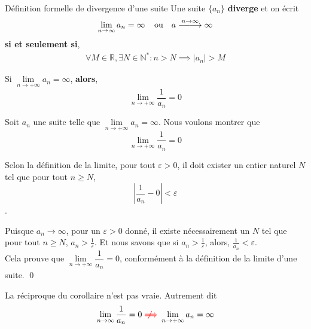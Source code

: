 \documentclass[16pt]{report}
\newcommand{\notimplies}{%
  \mathrel{{\ooalign{\hidewidth$\not\phantom{=}$\hidewidth\cr$\implies$}}}}
\DeclareRobustCommand{\looongrightarrow}{%
  \DOTSB\relbar\joinrel\relbar\joinrel\relbar\joinrel\rightarrow
}
\begin{document}
\begin{multicols*}{2}
    \begin{Definitionx}{Définition formelle de divergence d'une suite}{}
        Une suite $\{ a_n \}$ \textbf{diverge} et on écrit 
      \begin{align*}
        \lim\limits_{n  \to  \infty}{a_n} = 
        \infty \; \; \; \;\text{ou} \quad 
        a \stackrel{n \to \infty}{\looongrightarrow} \infty 
      \end{align*}
      \textbf{si et seulement si},  
        \begin{align*}
            \forall M \in \mathbb{R}, \exists N \in \mathbb{N}^{*} :
            n > N \implies |a_n| > M 
        \end{align*}
    \end{Definitionx}   

    \begin{corollary*}{}{}
       Si $\lim\limits_{n\to+\infty}a_n  = \infty$, \textbf{alors}, 
       \[ \lim\limits_{n\to+\infty}{\dfrac{1}{a_n}}  = 0  \]
   \end{corollary*} 
    

   \begin{Preuve}{}{}
        Soit \( a_n \) une suite telle que 
        \( \lim\limits_{n\to+\infty}a_n = \infty \). 
        Nous voulons montrer que 
        \[ \lim\limits_{n\to+\infty}\dfrac{1}{a_n} = 0 \]
        
        Selon la définition de la limite, pour tout \( \varepsilon > 0 \),
        il doit exister un entier naturel \( N \) tel que pour tout 
        \( n \geq N \), 
        \[ \left|\frac{1}{a_n} - 0\right| < \varepsilon \].
        
        Puisque \( a_n \to \infty \), pour un \( \varepsilon > 0 \) donné,
        il existe nécessairement un \( N \) tel que pour tout \( n \geq N \),
        \( a_n > \frac{1}{\varepsilon} \). Et nous savons que si 
        $a_n > \frac{1}{\varepsilon}$, alors,
        \( \frac{1}{a_n} < \varepsilon \).
        \vspace{1em}\\
        Cela prouve que 
        \( \lim\limits_{n\to+\infty}\dfrac{1}{a_n} = 0 \), 
        conformément à la définition de la limite d'une suite. \qed
    \end{Preuve}
    \begin{note}{}{}
        La réciproque du corollaire n'est pas vraie. Autrement dit  
        \begin{align*}
            \lim\limits_{n\to\infty}\frac{1}{a_n} = 0 
            \textcolor{red}{\notimplies}
            \lim\limits_{n\to+\infty}a_n  = \infty
        \end{align*}    
    \end{note}



\end{multicols*}
\end{document}
